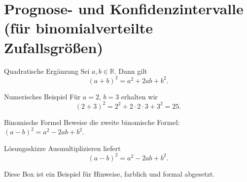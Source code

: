 \documentclass[11pt,a4paper,oneside]{article}
\begin{document}
	\section{Prognose- und Konfidenzintervalle (für binomialverteilte Zufallsgrößen)}
	
	\newpage
	
	
	\begin{theo}{Quadratische Ergänzung}
		Sei \(a,b\in \mathbb{R}\). Dann gilt
		\[
		(a+b)^2 = a^2 + 2ab + b^2.
		\]
	\end{theo}
	
	\begin{exem}{Numerisches Beispiel}
		Für \(a=2\), \(b=3\) erhalten wir
		\[
		(2+3)^2 = 2^2 + 2\cdot 2\cdot 3 + 3^2 = 25.
		\]
	\end{exem}
	
	\begin{aufgabe}{Binomische Formel}
		Beweise die zweite binomische Formel: \((a-b)^2 = a^2 - 2ab + b^2\).
	\end{aufgabe}
	
	\begin{loesung}{Lösungsskizze}
		Ausmultiplizieren liefert
		\[
		(a-b)^2 = a^2 - 2ab + b^2.
		\]
	\end{loesung}
	
	\begin{infobox}
		Diese Box ist ein Beispiel für Hinweise, farblich und formal abgesetzt.
	\end{infobox}
	
\end{document}
